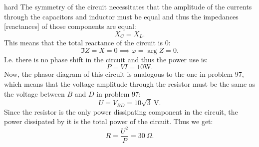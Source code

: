 \begin{solution}{hard}
The symmetry of the circuit necessitates that the amplitude of the currents through the capacitors and inductor must be equal and thus the impedances [reactances] of those components are equal:
$$X_C=X_L.$$
This means that the total reactance of the circuit is 0:
$$\Im Z=X=0\implies\varphi=\arg Z=0.$$I.e. there is no phase shift in the circuit and thus the power use is:
$$P=VI=10 \mathrm{W}.$$
Now, the phasor diagram of this circuit is analogous to the one in problem 97, which means that the voltage amplitude through the resistor must be the same as the voltage between $B$ and $D$ in problem 97:
$$U=V_{BD}=10\sqrt{3}\ \mathrm{V}.$$
Since the resistor is the only power dissipating component in the circuit, the power dissipated by it is the total power of the circuit. Thus we get:
$$R=\frac{U^2}{P}=30\ \Omega.$$
\end{solution}